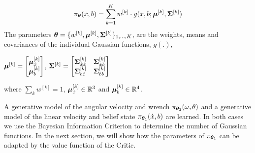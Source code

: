 \begin{equation}
 \pi_{\boldsymbol{\theta}}(\dot{x},b) = \sum\limits_{k=1}^{K} w^{[k]}	    \cdot  g(\dot{x},b;\boldsymbol{\mu}^{[k]},\boldsymbol{\Sigma}^{[k]}) \label{eq:GMM}
\end{equation}
The parameters $\boldsymbol{\theta} = \{w^{[k]},\boldsymbol{\mu}^{[k]},\boldsymbol{\Sigma}^{[k]}\}_{1,\dots,K}$, are the weights, means and covariances 
of the individual Gaussian functions, $g(.)$,
\begin{center}
$\boldsymbol{\mu}^{[k]} =  \begin{bmatrix} \boldsymbol{\mu}^{[k]}_{\dot{x}} \\ \boldsymbol{\mu}^{[k]}_{b} \end{bmatrix}$, 
$\boldsymbol{\Sigma}^{[k]} =  \begin{bmatrix} 
	  \boldsymbol{\Sigma}^{[k]}_{\dot{x}\dot{x}} & \boldsymbol{\Sigma}^{[k]}_{\dot{x}b} \\
	  \boldsymbol{\Sigma}^{[k]}_{b\dot{x}} & \boldsymbol{\Sigma}^{[k]}_{bb}
	  \end{bmatrix}$
\end{center}
where $\sum_{k} w^{[k]} = 1$, $\boldsymbol{\mu}^{[k]}_{\dot{x}} \in \mathbb{R}^{3}$ and  $\boldsymbol{\mu}^{[k]}_{b} \in \mathbb{R}^{4}$.

A generative model of the angular velocity and wrench $\pi_{\boldsymbol{\theta}_2}(\omega,\theta)$ and a generative model 
of the linear velocity and belief state $\pi_{\boldsymbol{\theta}_1}(\dot{x},b)$ are learned. 
In both cases we use the Bayesian Information Criterion to determine the number of Gaussian functions.
In the next section, we will show how the parameters of $\pi_{\boldsymbol{\theta}_1}$ can be adapted by the value function of the Critic.



